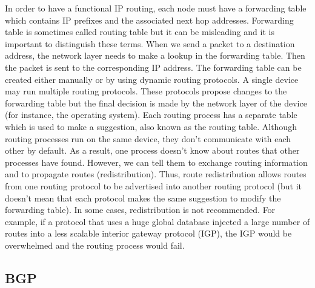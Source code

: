 \documentclass[a4paper]{article}
\begin{document}
In order to have a functional IP routing, each node must have a forwarding table which contains IP prefixes and the
associated next hop addresses. Forwarding table is sometimes called routing table but it can be misleading and it is
important to distinguish these terms. When we send a packet to a destination address, the network layer needs to make a
lookup in the forwarding table. Then the packet is sent to the corresponding IP address. The forwarding table can be
created either manually or by using dynamic routing protocols. A single device may run multiple routing protocols.
These protocols propose changes to the forwarding table but the final decision is made by the network layer of the
device (for instance, the operating system). Each routing process has a separate table which is used to make a
suggestion, also known as the routing table. Although routing processes run on the same device, they don't communicate
with each other by default. As a result, one process doesn't know about routes that other processes have found.
However, we can tell them to exchange routing information and to propagate routes (redistribution). Thus, route
redistribution allows routes from one routing protocol to be advertised into another routing protocol (but it doesn't
mean that each protocol makes the same suggestion to modify the forwarding table). In some cases, redistribution is not
recommended. For example, if a protocol that uses a huge global database injected a large number of routes into a less
scalable interior gateway protocol (IGP), the IGP would be overwhelmed and the routing process would fail.

\subsection{BGP}
\end{document}

